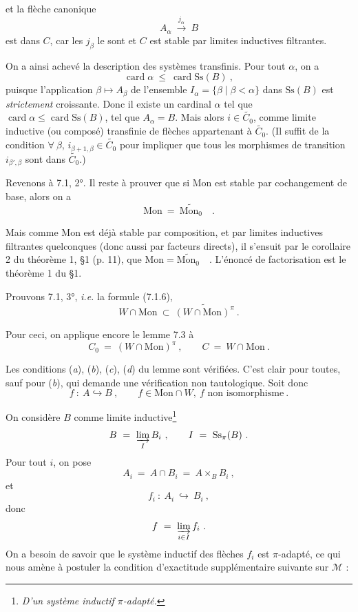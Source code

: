 \documentclass[11pt]{article}
\newcommand{\printedpage}[1]{\marginpar{\footnotesize p.~#1}}
\newcommand{\msp}[1]{\marginpar{\footnotesize [#1]}}
\newcommand{\Ss}{\mathrm{Ss}}
\newcommand{\card}{\operatorname{card}}
\newcommand{\Mon}{\mathrm{Mon}}
\begin{document}
\msp{page 93}

et la flèche canonique
\[
A_\alpha \ \xrightarrow{j_\alpha} \ B
\]
est dans $C$, car les $j_\beta$ le sont et $C$ est stable par limites inductives filtrantes.

On a ainsi achevé la description des systèmes transfinis. Pour tout $\alpha$, on a
\[
\card \alpha \ \leq \ \card \Ss(B) \ ,
\]
puisque l'application $\beta \longmapsto A_\beta$ de l'ensemble $I_\alpha = \{\beta \mid \beta < \alpha\}$ dans $\Ss(B)$ est \textit{strictement} croissante. Donc il existe un cardinal $\alpha$ tel que $\card \alpha \leq \card \Ss(B)$, tel que $A_\alpha = B$. Mais alors $i \in \widetilde{C_0}$, comme limite inductive (ou composé) transfinie de flèches appartenant à $\widetilde{C_0}$. (Il suffit de la condition $\forall\ \beta$, $i_{\beta+1,\beta} \in \widetilde{C_0}$ pour impliquer que tous les morphismes de transition $i_{\beta',\beta}$ sont dans $\widetilde{C_0}$.)

Revenons à 7.1, 2°. Il reste à prouver que si Mon est stable par cochangement de base, alors on a
\[
\Mon \ = \ \widetilde{\Mon_0} \quad .
\]

Mais comme Mon est déjà stable par composition, et par limites inductives filtrantes quelconques (donc aussi par facteurs directs), il s'ensuit par le corollaire 2 du théorème 1, §1 (p. 11), que $\Mon = \widetilde{\Mon_0}$\ \ . L'énoncé de factorisation est le théorème 1 du §1.

\printedpage{52}

\msp{page 94}

Prouvons 7.1, 3°, \textit{i.e.} la formule (7.1.6),
\[
W \cap \Mon \ \subset \ \widetilde{(W \cap \Mon)^{\pi}} \ .
\]

Pour ceci, on applique encore le lemme 7.3 à
\[
C_0 \ = \ (W \cap \Mon)^{\pi} \ , \qquad C \ = \ W \cap \Mon \ .
\]

Les conditions (\textit{a}), (\textit{b}), (\textit{c}), (\textit{d}) du lemme sont vérifiées. C'est clair pour toutes, sauf pour (\textit{b}), qui demande une vérification non tautologique. Soit donc
\[
f \ : \ A \hookrightarrow B \ , \qquad f \in \Mon \cap W,\ f \text{ non isomorphisme} \ .
\]

On considère $B$ comme limite inductive\footnote[33]{\textit{D'un système inductif $\pi$-adapté.}}
\[
B \ = \ \varinjlim_{I} B_i \ , \qquad I \ = \ \Ss_{\pi}(B) \ .
\]
Pour tout $i$, on pose
\[
A_i \ = \ A \cap B_i \ = \ A \times_B B_i \ ,
\]
et
\[
f_i \ : \ A_i \ \hookrightarrow \ B_i \ ,
\]
donc
\[
f \ = \ \varinjlim_{i \in I} f_i \ .
\]
On a besoin de savoir que le système inductif des flèches $f_i$ est $\pi$-adapté, ce qui nous amène à postuler la condition d'exactitude supplémentaire suivante sur $\mathcal{M}$ :
\end{document}
